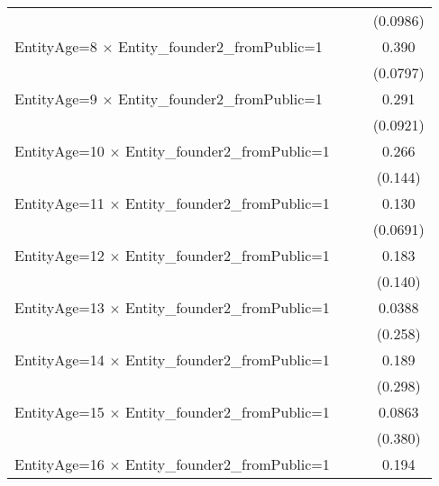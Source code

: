 {\begin{tabular}{l*{3}{c}}
                    &                     &                     &    (0.0986)         \\
[1em]
EntityAge=8 $\times$ Entity\_founder2\_fromPublic=1&                     &                     &       0.390\sym{***}\\
                    &                     &                     &    (0.0797)         \\
[1em]
EntityAge=9 $\times$ Entity\_founder2\_fromPublic=1&                     &                     &       0.291\sym{**} \\
                    &                     &                     &    (0.0921)         \\
[1em]
EntityAge=10 $\times$ Entity\_founder2\_fromPublic=1&                     &                     &       0.266         \\
                    &                     &                     &     (0.144)         \\
[1em]
EntityAge=11 $\times$ Entity\_founder2\_fromPublic=1&                     &                     &       0.130         \\
                    &                     &                     &    (0.0691)         \\
[1em]
EntityAge=12 $\times$ Entity\_founder2\_fromPublic=1&                     &                     &       0.183         \\
                    &                     &                     &     (0.140)         \\
[1em]
EntityAge=13 $\times$ Entity\_founder2\_fromPublic=1&                     &                     &      0.0388         \\
                    &                     &                     &     (0.258)         \\
[1em]
EntityAge=14 $\times$ Entity\_founder2\_fromPublic=1&                     &                     &       0.189         \\
                    &                     &                     &     (0.298)         \\
[1em]
EntityAge=15 $\times$ Entity\_founder2\_fromPublic=1&                     &                     &      0.0863         \\
                    &                     &                     &     (0.380)         \\
[1em]
EntityAge=16 $\times$ Entity\_founder2\_fromPublic=1&                     &                     &       0.194         \\

\end{tabular}}
